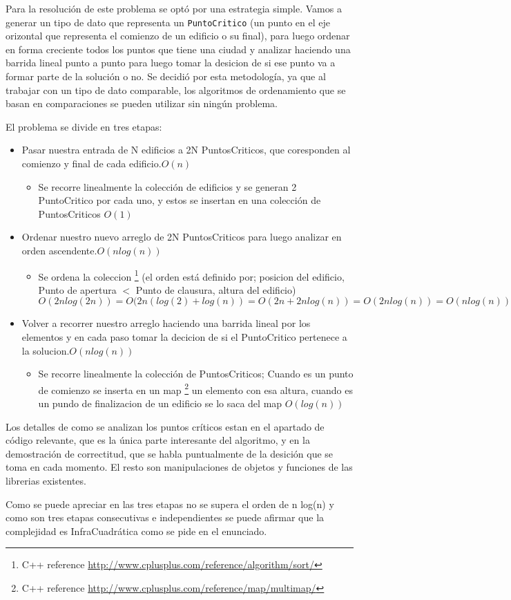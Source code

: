 Para la resolución de este problema se optó por una estrategia simple. Vamos a generar un tipo de dato que representa un \texttt{PuntoCritico} (un punto en el eje orizontal que representa el comienzo de un edificio o su final), para luego ordenar en forma creciente todos los puntos que tiene una ciudad y analizar haciendo una barrida lineal punto a punto para luego tomar la desicion de si ese punto va a formar parte de la solución o no.
Se decidió por esta metodología, ya que al trabajar con un tipo de dato comparable, los algoritmos de ordenamiento que se basan en comparaciones se pueden utilizar sin ningún problema.

El problema se divide en tres etapas:

\begin{itemize}
	\item Pasar nuestra entrada de N edificios a 2N PuntosCriticos, que coresponden al comienzo y final de cada edificio.$O(n)$
		\begin{itemize}
		\item  Se recorre linealmente la colección de edificios y se generan 2 PuntoCritico por cada uno, y estos se insertan en una colección de PuntosCriticos $O(1)$
		\end{itemize}
	\item Ordenar nuestro nuevo arreglo de 2N PuntosCriticos para luego analizar en orden ascendente.$O(n log(n))$
		\begin{itemize}
		\item  Se ordena la coleccion \footnote{C++ reference \url{http://www.cplusplus.com/reference/algorithm/sort/}} (el orden está definido por; posicion del edificio, Punto de apertura $<$ Punto de clausura, altura del edificio)\\
			$O(2n log(2n)) = O(2n (log(2) + log(n)) = O(2n + 2n log(n)) = O(2n log(n)) = O(n log(n))$
		\end{itemize}
	\item Volver a recorrer nuestro arreglo haciendo una barrida lineal por los elementos y en cada paso tomar la decicion de si el PuntoCritico pertenece a la solucion.$O(n log(n))$
	\begin{itemize}
		\item  Se recorre linealmente la colección de PuntosCriticos; Cuando es un punto de comienzo se inserta en un map 
		\footnote{C++ reference \url{http://www.cplusplus.com/reference/map/multimap/}}  un elemento con esa altura, cuando es un pundo de finalizacion de un edificio se lo saca del map $O(log(n))$
		\end{itemize}
\end{itemize}

Los detalles de como se analizan los puntos críticos estan en el apartado de código relevante, que es la única parte interesante del algoritmo, y en la demostración de correctitud, que se habla puntualmente de la desición que se toma en cada momento. El resto son manipulaciones de objetos y funciones de las librerias existentes.

Como se puede apreciar en las tres etapas no se supera el orden de n log(n) y como son tres etapas consecutivas e independientes se puede afirmar que la complejidad es InfraCuadrática como se pide en el enunciado.
